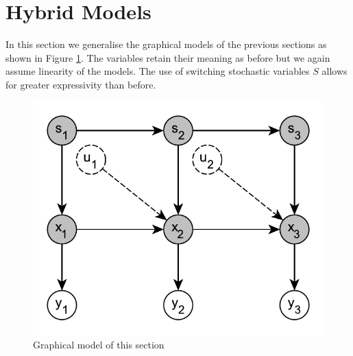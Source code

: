 \documentclass[../masters.tex]{subfiles}
\begin{document}
\graphicspath{{./imgs/}{../imgs/}} %

\section{Hybrid Models}
In this section we generalise the graphical models of the previous sections as shown in Figure \ref{fig_hybridmod}. The variables retain their meaning as before but we again assume linearity of the models. The
use of switching stochastic variables $S$ allows for greater expressivity than before.     
\begin{figure}[H] 
\centering
\includegraphics[scale=1.0]{hybrid_model.pdf}
\caption{Graphical model of this section}
\label{fig_hybridmod}
\end{figure}


%
%
\end{document}
